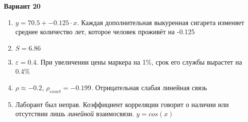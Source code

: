 \documentclass{article}
\begin{document}
\textbf{Вариант 20}
\begin{enumerate}
\item $y = 70.5+-0.125\cdot x$. Каждая дополнительная выкуренная сигарета изменяет среднее количество лет, которое человек проживёт на -0.125
\item $S = 6.86$
\item $\varepsilon = 0.4$. При увеличении цены маркера на 1\%, срок его службы вырастет на 0.4\%
\item $\rho \approx -0.2$, $\rho_{exact} = -0.199$. Отрицательная слабая линейная связь
\item Лаборант был неправ. Коэффициент корреляции говорит о наличии или отсутствии лишь \textit{линейной} взаимосвязи. $y = cos(x)$
\end{enumerate}
\end{document}

